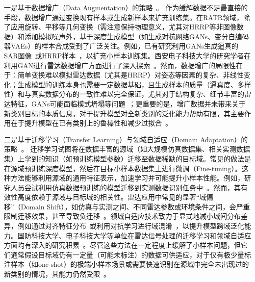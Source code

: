 {{一是基于数据增广（Data Augmentation）的策略~\cite{X}。} {作为缓解数据不足最直接的手段，数据增广通过变换现有样本或生成新样本来扩充训练集。在RATR领域，除了应用旋转、平移等几何变换（需注意保持物理意义，尤其对HRRP等非图像数据）和添加模拟噪声外，基于深度生成模型（如生成对抗网络GANs、变分自编码器VAEs）的样本合成受到了广泛关注。例如，已有研究利用GANs生成逼真的SAR图像~\cite{X}或HRRP样本~\cite{X}，以扩充小样本训练集。西安电子科技大学的研究学者在利用GAN进行雷达数据增广方面进行了深入探索~\cite{X}。然而，数据增广的局限性在于：简单变换难以模拟雷达数据（尤其是HRRP）对姿态等因素的复杂、非线性变化；生成模型的训练本身也需要一定数据基础，且生成样本的质量（逼真度、多样性）和与真实数据分布的一致性难以完全保证，尤其对于结构复杂、细节丰富的雷达特征，GANs可能面临模式坍塌等问题~\cite{X}；更重要的是，增广数据并未带来关于新类别目标的本质信息，对于提升模型对全新类别的泛化能力帮助有限，其主要作用在于提升模型在已有类别上的鲁棒性和减少过拟合~\cite{X}。}

{二是基于迁移学习（Transfer Learning）与领域自适应（Domain Adaptation）的策略~\cite{X}。} {迁移学习试图将在数据丰富的源域（如大规模仿真数据集、相关实测数据集）上学到的知识（如预训练模型参数）迁移至数据稀缺的目标域。常见的做法是在源域预训练深度模型，然后在目标小样本数据集上进行微调（Fine-tuning）。这种方法能够利用源域的通用特征表示，加速学习并可能提升小样本性能。例如，研究人员尝试利用仿真数据预训练的模型迁移到实测数据识别任务中~\cite{X}。然而，其有效性高度依赖于源域与目标域的相关性。雷达应用中常见的显著“域偏移”（Domain Shift），如仿真与实测之间、不同雷达参数或环境条件之间，会严重限制迁移效果，甚至导致负迁移~\cite{X}。领域自适应技术致力于显式地减小域间分布差异，例如通过对齐特征分布~\cite{X}或利用对抗学习进行域混淆~\cite{X}，以提升模型跨域泛化能力。国防科技大学、电子科技大学等单位在雷达信号处理的迁移学习和领域自适应方面均有深入的研究积累~\cite{X}。尽管这些方法在一定程度上缓解了小样本问题，但它们通常假设目标域仍有一定量（可能未标注）的数据可供适应，对于仅有极少量标注样本（如one-shot）的极端小样本场景或需要快速识别在源域中完全未出现过的新类别的情况，其能力仍然受限~\cite{X}。}

}
